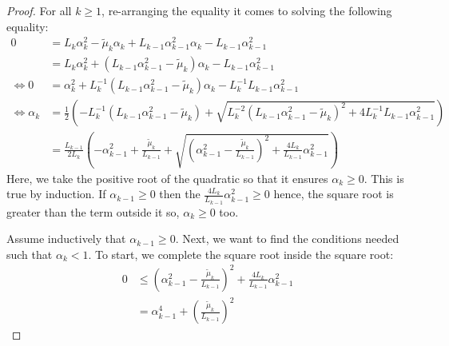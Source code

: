 \documentclass[12pt]{article}
\begin{document}
        \begin{proof}
            For all $k \ge 1$, re-arranging the equality it comes to solving the following equality: 
            \begin{align*}
                0 &= L_k\alpha_k^2 - \tilde\mu_k\alpha_k + L_{k - 1}\alpha_{k - 1}^2\alpha_k - L_{k - 1}\alpha_{k - 1}^2
                \\
                &= L_k\alpha_k^2 + (L_{k - 1}\alpha_{k - 1}^2 - \tilde \mu_k)\alpha_k - L_{k - 1}\alpha_{k - 1}^2
                \\
                \iff 0 &=
                \alpha_k^2 + L_k^{-1}(L_{k - 1}\alpha_{k - 1}^2 - \tilde \mu_k)\alpha_k - L_k^{-1}L_{k - 1}\alpha_{k - 1}^2
                \\
                \iff 
                \alpha_k &= 
                \frac{1}{2}\left(
                    -L^{-1}_k(L_{k - 1} \alpha_{k - 1}^2 - \tilde\mu_k)
                    + \sqrt{
                        L_k^{-2}(L_{k - 1}\alpha_{k - 1}^2 - \tilde \mu_k)^2
                        + 4L_k^{-1}L_{k - 1} \alpha_{k - 1}^2
                    }
                \right)
                \\
                &= \frac{L_{k-1}}{2L_k}\left(
                    - \alpha_{k - 1}^2 + \frac{\tilde \mu_k}{L_{k - 1}}
                    + \sqrt{
                        \left(
                            \alpha_{k - 1}^2 - \frac{\tilde \mu_k}{L_{k - 1}}
                        \right)^2 + \frac{4L_k}{L_{k - 1}}\alpha_{k - 1}^2
                    }
                \right)
            \end{align*}
            Here, we take the positive root of the quadratic so that it ensures $\alpha_k \ge 0$. 
            This is true by induction. 
            If $\alpha_{k - 1} \ge 0$ then the $\frac{4L_k}{L_{k - 1}}\alpha_{k - 1}^2 \ge 0$ hence, the square root is greater than the term outside it so, $\alpha_k \ge 0$ too. 
            \par
            Assume inductively that $\alpha_{k - 1} \ge 0$. 
            Next, we want to find the conditions needed such that $\alpha_k < 1$. 
            To start, we complete the square root inside the square root: 
            \begin{align*}
                0&\le 
                \left(
                    \alpha_{k - 1}^2 - \frac{\tilde \mu_k}{L_{k - 1}}
                \right)^2 + \frac{4L_k}{L_{k - 1}}\alpha_{k - 1}^2
                \\
                &= \alpha_{k - 1}^4 + \left(\frac{\tilde \mu_k}{L_{k - 1}}\right)^2

\end{align*}
\end{proof}
\end{document}
